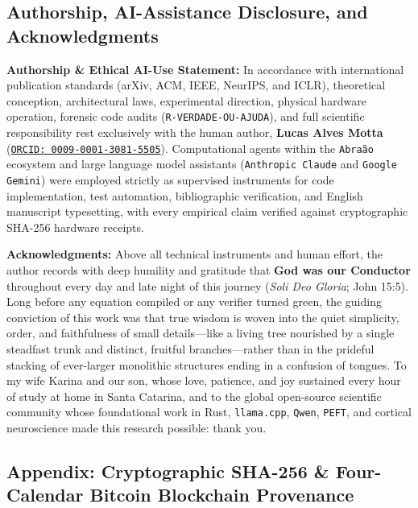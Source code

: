 \documentclass[10pt,a4paper]{article}
\begin{document}
\subsection*{Authorship, AI-Assistance Disclosure, and Acknowledgments}

\textbf{Authorship \& Ethical AI-Use Statement:} In accordance with international publication standards (arXiv, ACM, IEEE, NeurIPS, and ICLR), theoretical conception, architectural laws, experimental direction, physical hardware operation, forensic code audits (\texttt{R-VERDADE-OU-AJUDA}), and full scientific responsibility rest exclusively with the human author, \textbf{Lucas Alves Motta} (\href{https://orcid.org/0009-0001-3081-5505}{\texttt{ORCID: 0009-0001-3081-5505}}). Computational agents within the \texttt{Abra\~ao} ecosystem and large language model assistants (\texttt{Anthropic Claude} and \texttt{Google Gemini}) were employed strictly as supervised instruments for code implementation, test automation, bibliographic verification, and English manuscript typesetting, with every empirical claim verified against cryptographic SHA-256 hardware receipts.

\textbf{Acknowledgments:} Above all technical instruments and human effort, the author records with deep humility and gratitude that \textbf{God was our Conductor} throughout every day and late night of this journey (\textit{Soli Deo Gloria}; John 15:5). Long before any equation compiled or any verifier turned green, the guiding conviction of this work was that true wisdom is woven into the quiet simplicity, order, and faithfulness of small details---like a living tree nourished by a single steadfast trunk and distinct, fruitful branches---rather than in the prideful stacking of ever-larger monolithic structures ending in a confusion of tongues. To my wife Karina and our son, whose love, patience, and joy sustained every hour of study at home in Santa Catarina, and to the global open-source scientific community whose foundational work in Rust, \texttt{llama.cpp}, \texttt{Qwen}, \texttt{PEFT}, and cortical neuroscience made this research possible: thank you.

\subsection*{Appendix: Cryptographic SHA-256 \& Four-Calendar Bitcoin Blockchain Provenance}
\end{document}
